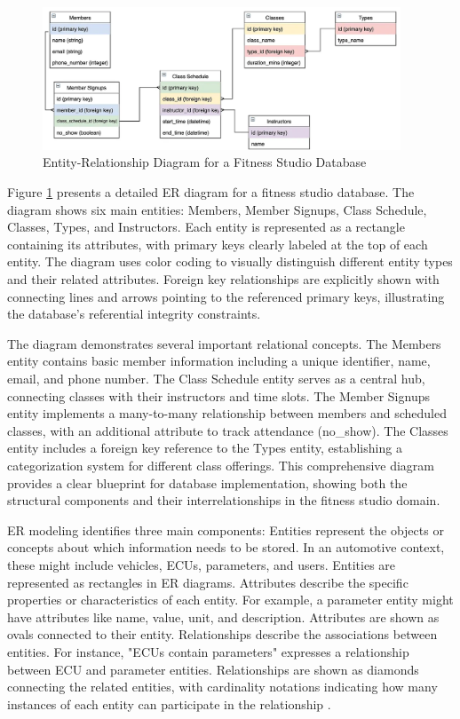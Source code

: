 \begin{figure}[ht]
    \centering
    \includegraphics[width=0.95\textwidth]{figures/er_diagram.png}
    \caption{Entity-Relationship Diagram for a Fitness Studio Database \cite{chen1976entity}}
    \label{fig:er-diagram}
\end{figure}

Figure \ref{fig:er-diagram} presents a detailed \ac{ER} diagram for a fitness studio database. The diagram shows six main entities: Members, Member Signups, Class Schedule, Classes, Types, and Instructors. Each entity is represented as a rectangle containing its attributes, with primary keys clearly labeled at the top of each entity. The diagram uses color coding to visually distinguish different entity types and their related attributes. Foreign key relationships are explicitly shown with connecting lines and arrows pointing to the referenced primary keys, illustrating the database's referential integrity constraints.

The diagram demonstrates several important relational concepts. The Members entity contains basic member information including a unique identifier, name, email, and phone number. The Class Schedule entity serves as a central hub, connecting classes with their instructors and time slots. The Member Signups entity implements a many-to-many relationship between members and scheduled classes, with an additional attribute to track attendance (no\_show). The Classes entity includes a foreign key reference to the Types entity, establishing a categorization system for different class offerings. This comprehensive diagram provides a clear blueprint for database implementation, showing both the structural components and their interrelationships in the fitness studio domain.

\ac{ER} modeling identifies three main components: Entities represent the objects or concepts about which information needs to be stored. In an automotive context, these might include vehicles, \acp{ECU}, parameters, and users. Entities are represented as rectangles in \ac{ER} diagrams. Attributes describe the specific properties or characteristics of each entity. For example, a parameter entity might have attributes like name, value, unit, and description. Attributes are shown as ovals connected to their entity. Relationships describe the associations between entities. For instance, "\acp{ECU} contain parameters" expresses a relationship between \ac{ECU} and parameter entities. Relationships are shown as diamonds connecting the related entities, with cardinality notations indicating how many instances of each entity can participate in the relationship \cite{elmasri2015fundamentals}.

